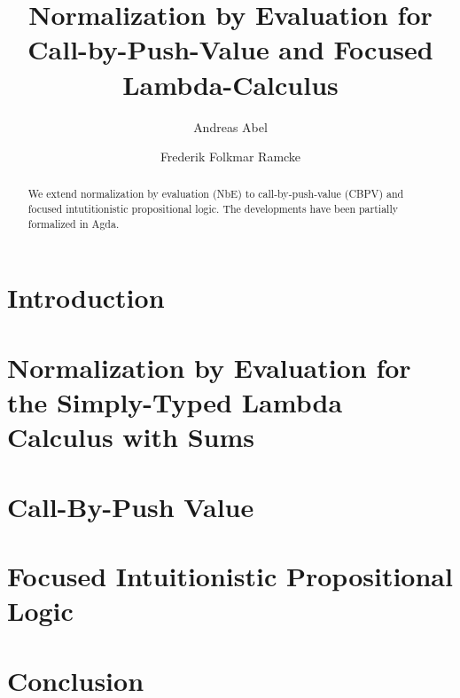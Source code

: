 \documentclass[a4paper,USenglish,cleveref, autoref]{lipics-v2019}
\title{Normalization by Evaluation for Call-by-Push-Value and Focused Lambda-Calculus}
\author{Andreas Abel}
  {Department of Computer Science and Engineering,
    Chalmers and Gothenburg University,
    Sweden \and
    \url{www.cse.chalmers.se/~abela}
  }
  {andreas.abel@gu.se}
  {https://orcid.org/0000-0003-0420-4492}
  {VR Grant 2014-04864 \emph{Termination
      Certificates for Dependently-Typed Programs and Proofs via
      Refinement Types}
  }
\author{Frederik Folkmar Ramcke}
  {Department of Computer Science and Engineering,
    Chalmers and Gothenburg University,
    Sweden
  }
  {}%
  {}%
  {}%
\begin{document}
\maketitle

\begin{abstract}
  We extend normalization by evaluation (NbE) to call-by-push-value
  (CBPV) and focused intutitionistic propositional logic.
  The developments have been partially formalized in Agda.
\end{abstract}


\section{Introduction}
\label{sec:intro}


\nocite{bergerSchwichtenberg:lics91}

\nocite{jungTiuryn:tlca93}

\nocite{altenkirchHofmannStreicher:ctcs95}

\nocite{abel:habil}

\nocite{danvy:popl96}

\nocite{fioreSimpson:tlca99}

\nocite{altenkirchDybjerHofmannScott:lics01}

\nocite{balatDiCosmoFiore:popl04}

\nocite{altenkirchUustalu:flops04}

\nocite{barral:PhD}

\nocite{scherer:popl17}


\section{Normalization by Evaluation for the Simply-Typed Lambda
  Calculus with Sums}
\label{sec:lambda}

\section{Call-By-Push Value}
\label{sec:cbpv}

\section{Focused Intuitionistic Propositional Logic}
\label{sec:fipl}

\section{Conclusion}
\label{sec:concl}



\end{document}
